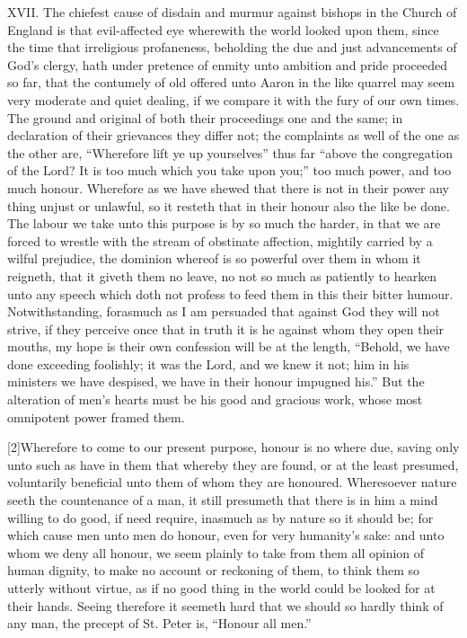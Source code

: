XVII. The chiefest cause of disdain and murmur against bishops in the Church of England is that evil-affected eye wherewith the world looked upon them, since the time that irreligious profaneness, beholding the due and just advancements of God’s clergy, hath under pretence of enmity unto ambition and pride proceeded so far, that the contumely of old offered unto Aaron in the like quarrel may seem very moderate and quiet dealing, if we compare it with the fury of our own times. The ground and original of both their proceedings one and the same; in declaration of their grievances they differ not; the complaints as well of the one as the other are, “Wherefore lift ye up yourselves” thus far “above the congregation of the Lord? It is too much which you take upon you;” too much power, and too much honour. Wherefore as we have shewed that there is not in their power any thing unjust or unlawful, so it resteth that in their honour also the like be done. The labour we take  unto this purpose is by so much the harder, in that we are forced to wrestle with the stream of obstinate affection, mightily carried by a wilful prejudice, the dominion whereof is so powerful over them in whom it reigneth, that it giveth them no leave, no not so much as patiently to hearken unto any speech which doth not profess to feed them in this their bitter humour. Notwithstanding, forasmuch as I am persuaded that against God they will not strive, if they perceive once that in truth it is he against whom they open their mouths, my hope is their own confession will be at the length, “Behold, we have done exceeding foolishly; it was the Lord, and we knew it not; him in his ministers we have despised, we have in their honour impugned his.” But the alteration of men’s hearts must be his good and gracious work, whose most omnipotent power framed them.

[2]Wherefore to come to our present purpose, honour is no where due, saving only unto such as have in them that whereby they are found, or at the least presumed, voluntarily beneficial unto them of whom they are honoured. Wheresoever nature seeth the countenance of a man, it still presumeth that there is in him a mind willing to do good, if need require, inasmuch as by nature so it should be; for which cause men unto men do honour, even for very humanity’s sake: and unto whom we deny all honour, we seem plainly to take from them all opinion of human dignity, to make no account or reckoning of them, to think them so utterly without virtue, as if no good thing in the world could be looked for at their hands. Seeing therefore it seemeth hard that we should so hardly think of any man, the precept of St. Peter is, “Honour all men.”


